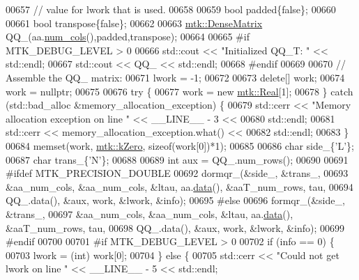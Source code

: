 \begin{DoxyCode}
00657   \textcolor{comment}{// value for lwork that is used.}
00658 
00659   \textcolor{keywordtype}{bool} padded\{\textcolor{keyword}{false}\};
00660 
00661   \textcolor{keywordtype}{bool} transpose\{\textcolor{keyword}{false}\};
00662 
00663   \hyperlink{classmtk_1_1DenseMatrix}{mtk::DenseMatrix} QQ\_(aa.\hyperlink{classmtk_1_1DenseMatrix_af6f78373aaf2136f0c78974d7c8de0a8}{num\_cols}(),padded,transpose);
00664 
00665 \textcolor{preprocessor}{  #if MTK\_DEBUG\_LEVEL > 0}
00666   std::cout << \textcolor{stringliteral}{"Initialized QQ\_T: "} << std::endl;
00667   std::cout << QQ\_ << std::endl;
00668 \textcolor{preprocessor}{  #endif}
00669 
00670   \textcolor{comment}{// Assemble the QQ\_ matrix:}
00671   lwork = -1;
00672 
00673   \textcolor{keyword}{delete}[] work;
00674   work = \textcolor{keyword}{nullptr};
00675 
00676   \textcolor{keywordflow}{try} \{
00677     work = \textcolor{keyword}{new} \hyperlink{group__c01-roots_gac080bbbf5cbb5502c9f00405f894857d}{mtk::Real}[1];
00678   \} \textcolor{keywordflow}{catch} (std::bad\_alloc &memory\_allocation\_exception) \{
00679     std::cerr << \textcolor{stringliteral}{"Memory allocation exception on line "} << \_\_LINE\_\_ - 3 <<
00680       std::endl;
00681     std::cerr << memory\_allocation\_exception.what() <<
00682       std::endl;
00683   \}
00684   memset(work, \hyperlink{group__c01-roots_ga59a451a5fae30d59649bcda274fea271}{mtk::kZero}, \textcolor{keyword}{sizeof}(work[0])*1);
00685 
00686   \textcolor{keywordtype}{char} side\_\{\textcolor{charliteral}{'L'}\};
00687   \textcolor{keywordtype}{char} trans\_\{\textcolor{charliteral}{'N'}\};
00688 
00689   \textcolor{keywordtype}{int} aux = QQ\_.num\_rows();
00690 
00691 \textcolor{preprocessor}{  #ifdef MTK\_PRECISION\_DOUBLE}
00692   dormqr\_(&side\_, &trans\_,
00693           &aa\_num\_cols, &aa\_num\_cols, &ltau, aa.\hyperlink{classmtk_1_1DenseMatrix_a16b3ff56feb2658b9fc7147d1de4d8e7}{data}(), &aaT\_num\_rows, tau,
00694           QQ\_.data(), &aux, work, &lwork, &info);
00695 \textcolor{preprocessor}{  #else}
00696   formqr\_(&side\_, &trans\_,
00697           &aa\_num\_cols, &aa\_num\_cols, &ltau, aa.\hyperlink{classmtk_1_1DenseMatrix_a16b3ff56feb2658b9fc7147d1de4d8e7}{data}(), &aaT\_num\_rows, tau,
00698           QQ\_.data(), &aux, work, &lwork, &info);
00699 \textcolor{preprocessor}{  #endif}
00700 
00701 \textcolor{preprocessor}{  #if MTK\_DEBUG\_LEVEL > 0}
00702   \textcolor{keywordflow}{if} (info == 0) \{
00703     lwork = (int) work[0];
00704   \} \textcolor{keywordflow}{else} \{
00705     std::cerr << \textcolor{stringliteral}{"Could not get lwork on line "} << \_\_LINE\_\_ - 5 << std::endl;

\end{DoxyCode}

